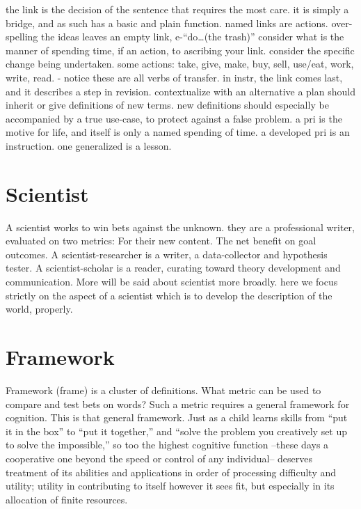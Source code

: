 \documentclass[
]{book}
\begin{document}
the link is the decision of the sentence that requires the most care.
it is simply a bridge, and as such has a basic and plain function.
named links are actions.
over-spelling the ideas leaves an empty link, e-``do\ldots(the
trash)'' consider what is the manner of spending time, if an
action, to ascribing your link. consider the specific change
being undertaken. some actions: take, give, make, buy, sell,
use/eat, work, write, read.
- notice these are all verbs of transfer.
in instr, the link comes last, and it describes a step in revision.
contextualize with an alternative
a plan should inherit or give definitions of new terms.
new definitions should especially be accompanied by a true use-case, to protect against a false problem.
a pri is the motive for life, and itself is only a named spending of time.
a developed pri is an instruction.
one generalized is a lesson.

\section{Scientist}\label{scientist}

A scientist works to win bets against the unknown. they are a professional writer, evaluated on two metrics:
For their new content.
The net benefit on goal outcomes.
A scientist-researcher is a writer, a data-collector and hypothesis tester.
A scientist-scholar is a reader, curating toward theory development and communication.
More will be said about scientist more broadly. here we focus strictly on the aspect of a scientist which is to develop the description of the world, properly.

\section{Framework}\label{framework}

Framework (frame) is a cluster of definitions.
What metric can be used to compare and test bets on words?
Such a metric requires a general framework for cognition.
This is that general framework.
Just as a child learns skills from ``put it in the box'' to ``put it together,'' and ``solve the problem you creatively set up to solve the impossible,'' so too the highest cognitive function --these days a cooperative one beyond the speed or control of any individual-- deserves treatment of its abilities and applications in order of processing difficulty and utility; utility in contributing to itself however it sees fit, but especially in its allocation of finite resources.
\end{document}
